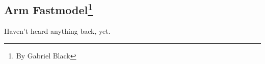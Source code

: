 \subsection[Arm Fastmodel]{Arm Fastmodel\footnote{By Gabriel Black}}

Haven't heard anything back, yet.
